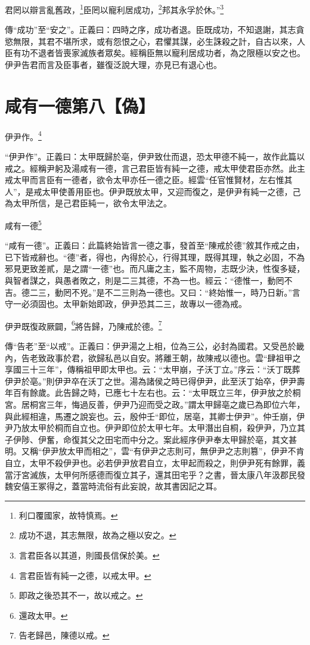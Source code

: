 君罔以辯言亂舊政，\footnote{利口覆國家，故特慎焉。}臣罔以寵利居成功，\footnote{成功不退，其志無限，故為之極以安之。}邦其永孚於休。”\footnote{言君臣各以其道，則國長信保於美。}

{\noindent\zhuan{}\fzbyks 傳“成功”至“安之”。正義曰：四時之序，成功者退。臣既成功，不知退謝，其志貪慾無限，其君不堪所求，或有怨恨之心，君懼其謀，必生誅殺之計，自古以來，人臣有功不退者皆喪家滅族者眾矣。經稱臣無以寵利居成功者，為之限極以安之也。伊尹告君而言及臣事者，雖復泛說大理，亦見已有退心也。 \par}

\section{咸有一德第八【偽】}


伊尹作。\footnote{言君臣皆有純一之德，以戒太甲。}

{\noindent\shu{}\fzkt “伊尹作”。正義曰：太甲既歸於亳，伊尹致仕而退，恐太甲德不純一，故作此篇以戒之。經稱尹躬及湯咸有一德，言己君臣皆有純一之德，戒太甲使君臣亦然。此主戒太甲而言臣有一德者，欲令太甲亦任一德之臣。經雲“任官惟賢材，左右惟其人”，是戒太甲使善用臣也。伊尹既放太甲，又迎而復之，是伊尹有純一之德，己為太甲所信，是己君臣純一，欲令太甲法之。 \par}

咸有一德\footnote{即政之後恐其不一，故以戒之。}

{\noindent\shu{}\fzkt “咸有一德”。正義曰：此篇終始皆言一德之事，發首至“陳戒於德”敘其作戒之由，已下皆戒辭也。“德”者，得也，內得於心，行得其理，既得其理，執之必固，不為邪見更致差貳，是之謂“一德”也。而凡庸之主，監不周物，志既少決，性復多疑，與智者謀之，與愚者敗之，則是二三其德，不為一也。經云：“德惟一，動罔不吉。德二三，動罔不兇。”是不二三則為一德也。又曰：“終始惟一，時乃日新。”言守一必須固也。太甲新始即政，伊尹恐其二三，故專以一德為戒。 \par}

伊尹既復政厥闢，\footnote{還政太甲。}將告歸，乃陳戒於德。\footnote{告老歸邑，陳德以戒。}


{\noindent\zhuan{}\fzbyks 傳“告老”至“以戒”。正義曰：伊尹湯之上相，位為三公，必封為國君。又受邑於畿內，告老致政事於君，欲歸私邑以自安。將離王朝，故陳戒以德也。雲“肆祖甲之享國三十三年”，傳稱祖甲即太甲也。云：“太甲崩，子沃丁立。”序云：“沃丁既葬伊尹於亳。”則伊尹卒在沃丁之世。湯為諸侯之時已得伊尹，此至沃丁始卒，伊尹壽年百有餘歲。此告歸之時，已應七十左右也。云：“太甲既立三年，伊尹放之於桐宮。居桐宮三年，悔過反善，伊尹乃迎而受之政。”謂太甲歸亳之歲已為即位六年，與此經相違，馬遷之說妄也。云，殷仲壬“即位，居亳，其卿士伊尹”。仲壬崩，伊尹乃放太甲於桐而自立也。伊尹即位於太甲七年。太甲潛出自桐，殺伊尹，乃立其子伊陟、伊奮，命復其父之田宅而中分之。案此經序伊尹奉太甲歸於亳，其文甚明。又稱“伊尹放太甲而相之”，雲“有伊尹之志則可，無伊尹之志則篡”，伊尹不肯自立，太甲不殺伊尹也。必若伊尹放君自立，太甲起而殺之，則伊尹死有餘罪，義當汙宮滅族，太甲何所感德而復立其子，還其田宅乎？之書，晉太康八年汲郡民發魏安僖王冢得之，蓋當時流俗有此妄說，故其書因記之耳。 \par}

